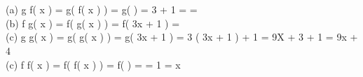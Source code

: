  \\

  \\

(a) \mspace{9mu} g \circ f\left( x \right) = g\left( f\left( x \right) \right) = g\left( \right) = 3 \cdot {} + 1 = =  \\

(b) \mspace{9mu} f \circ g\left( x \right) = f\left( g\left( x \right) \right) = f\left( 3x + 1 \right) =  \\

(c) \mspace{9mu} g \circ g\left( x \right) = g\left( g\left( x \right) \right) = g\left( 3x + 1 \right) = 3 \cdot \left( 3x + 1 \right) + 1 = 9X + 3 + 1 = 9x + 4 \\

(c) \mspace{9mu} f \circ f\left( x \right) = f\left( f\left( x \right) \right) = f\left( \right) =  = 1 \cdot {} = x

